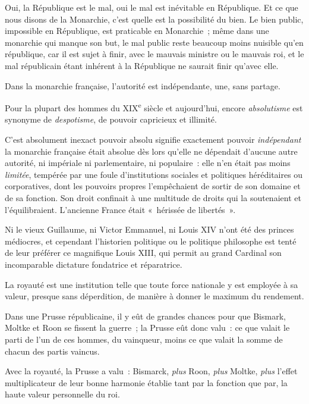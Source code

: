 \documentclass[french,twoside]{book} %
\newcommand{\astermono}{\medskip\centerline{\color{rubric}\large\selectfont{\syms ✻}}\medskip\par}%
\begin{document}
\astermono

\noindent Oui, la République est le mal, oui le mal est inévitable en République. Et ce que nous disons de la Monarchie, c’est quelle est la possibilité du bien. Le bien public, impossible en République, est praticable en Monarchie ; même dans une monarchie qui manque son but, le mal public reste beaucoup moins nuisible qu’en république, car il est sujet à finir, avec le mauvais ministre ou le mauvais roi, et le mal républicain étant inhérent à la République ne saurait finir qu’avec elle.\par

\astermono

\noindent Dans la monarchie française, l’autorité est indépendante, une, sans partage.\par
Pour la plupart des hommes du XIX\textsuperscript{e} siècle et aujourd’hui, encore \emph{absolutisme} est synonyme de \emph{despotisme}, de pouvoir capricieux et illimité.\par
C’est absolument inexact pouvoir absolu signifie exactement pouvoir \emph{indépendant} la monarchie française était absolue dès lors qu’elle ne dépendait d’aucune autre autorité, ni impériale ni parlementaire, ni populaire : elle n’en était pas moins \emph{limitée}, tempérée par une foule d’institutions sociales et politiques héréditaires ou corporatives, dont les pouvoirs propres l’empêchaient de sortir de son domaine et de sa fonction. Son droit confinait à une multitude de droits qui la soutenaient et l’équilibraient. L’ancienne France était « hérissée de libertés ».\par

\astermono

\noindent Ni le vieux Guillaume, ni Victor Emmanuel, ni Louis XIV n’ont été des princes médiocres, et cependant l’historien politique ou le politique philosophe est tenté de leur préférer ce magnifique Louis XIII, qui permit au grand Cardinal son incomparable dictature fondatrice et réparatrice.\par
La royauté est une institution telle que toute force nationale y est employée à sa valeur, presque sans déperdition, de manière à donner le maximum du rendement.\par
Dans une Prusse républicaine, il y eût de grandes chances pour que Bismark, Moltke et Roon se fissent la guerre ; la Prusse eût donc valu : ce que valait le parti de l’un de ces hommes, du vainqueur, moins ce que valait la somme de chacun des partis vaincus.\par
Avec la royauté, la Prusse a valu : Bismarck, \emph{plus} Roon, \emph{plus} Moltke, \emph{plus} l’effet multiplicateur de leur bonne harmonie établie tant par la fonction que par, la haute valeur personnelle du roi.\par
\end{document}
